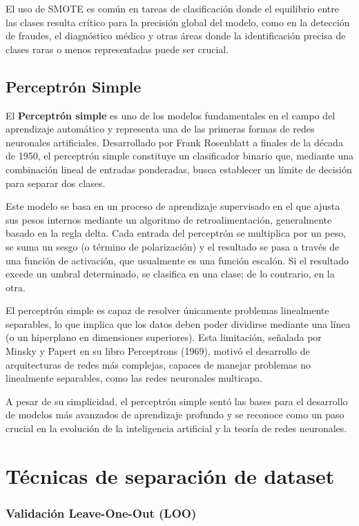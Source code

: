 \documentclass{article}
\begin{document}
    El uso de SMOTE es común en tareas de clasificación donde el equilibrio entre las clases resulta crítico para la precisión global del modelo, como en la detección de fraudes, el diagnóstico médico y otras áreas donde la identificación precisa de clases raras o menos representadas puede ser crucial.
    
\subsection{Perceptrón Simple}

El \textbf{Perceptrón simple} es uno de los modelos fundamentales en el campo del aprendizaje automático y representa una de las primeras formas de redes neuronales artificiales. Desarrollado por Frank Rosenblatt a finales de la década de 1950, el perceptrón simple constituye un clasificador binario que, mediante una combinación lineal de entradas ponderadas, busca establecer un límite de decisión para separar dos clases.

Este modelo se basa en un proceso de aprendizaje supervisado en el que ajusta sus pesos internos mediante un algoritmo de retroalimentación, generalmente basado en la regla delta. Cada entrada del perceptrón se multiplica por un peso, se suma un sesgo (o término de polarización) y el resultado se pasa a través de una función de activación, que usualmente es una función escalón. Si el resultado excede un umbral determinado, se clasifica en una clase; de lo contrario, en la otra.

El perceptrón simple es capaz de resolver únicamente problemas linealmente separables, lo que implica que los datos deben poder dividirse mediante una línea (o un hiperplano en dimensiones superiores). Esta limitación, señalada por Minsky y Papert en su libro Perceptrons (1969), motivó el desarrollo de arquitecturas de redes más complejas, capaces de manejar problemas no linealmente separables, como las redes neuronales multicapa.

A pesar de su simplicidad, el perceptrón simple sentó las bases para el desarrollo de modelos más avanzados de aprendizaje profundo y se reconoce como un paso crucial en la evolución de la inteligencia artificial y la teoría de redes neuronales.

\section{Técnicas de separación de dataset}

\subsubsection{Validación Leave-One-Out (LOO)}
\end{document}
